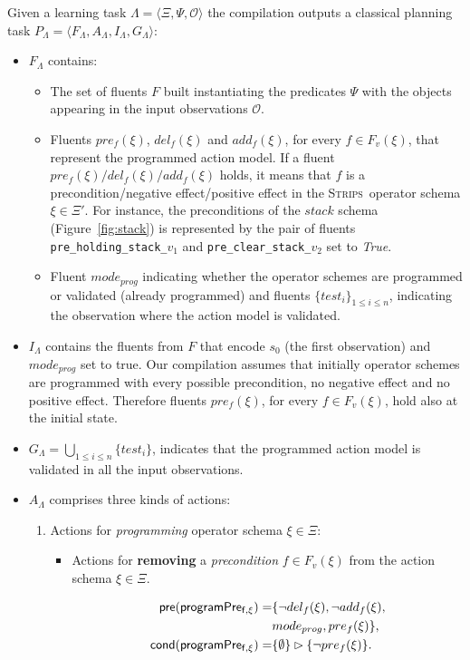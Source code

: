 \documentclass{article}
\newcommand{\tup}[1]{{\langle #1 \rangle}}
\newcommand{\pre}{\mathsf{pre}}     %
\newcommand{\cond}{\mathsf{cond}}   %
\newcommand{\strips}{\textsc{Strips}}     %
\begin{document}
Given a learning task $\Lambda=\tup{\Xi,\Psi,\mathcal{O}}$ the compilation outputs a classical planning task $P_{\Lambda}=\tup{F_{\Lambda},A_{\Lambda},I_{\Lambda},G_{\Lambda}}$:
\begin{itemize}
\item $F_{\Lambda}$ contains:
\begin{itemize}
\item The set of fluents $F$ built instantiating the predicates $\Psi$ with the objects appearing in the input observations $\mathcal{O}$.
\item Fluents $pre_f(\xi)$, $del_f(\xi)$ and $add_f(\xi)$, for every $f\in F_v(\xi)$, that represent the programmed action model. If a fluent $pre_f(\xi)/del_f(\xi)/add_f(\xi)$ holds, it means that $f$ is a precondition/negative effect/positive effect in the \strips\ operator schema $\xi\in \Xi'$. For instance, the preconditions of the $stack$ schema (Figure~\ref{fig:stack}) is represented by the pair of fluents {\small\tt pre\_holding\_stack\_$v_1$} and {\small\tt pre\_clear\_stack\_$v_2$} set to {\em True}.
\item Fluent $mode_{prog}$ indicating whether the operator schemes are programmed or validated (already programmed) and fluents $\{test_i\}_{1\leq i\leq n}$, indicating the observation where the action model is validated.
\end{itemize}
\item $I_{\Lambda}$ contains the fluents from $F$ that encode $s_0$ (the first observation) and $mode_{prog}$ set to true. Our compilation assumes that initially operator schemes are programmed with every possible precondition, no negative effect and no positive effect. Therefore fluents $pre_f(\xi)$, for every $f\in F_v(\xi)$, hold also at the initial state.
\item $G_{\Lambda}=\bigcup_{1\leq i\leq n}\{test_i\}$, indicates that the programmed action model is validated in all the input observations.
\item $A_{\Lambda}$ comprises three kinds of actions:
\begin{enumerate}
\item Actions for {\em programming} operator schema $\xi\in\Xi$:
\begin{itemize}
\item Actions for {\bf removing} a {\em precondition} $f\in F_v(\xi)$ from the action schema $\xi\in\Xi$.

\begin{small}
\begin{align*}
\hspace*{7pt}\pre(\mathsf{programPre_{f,\xi}})=&\{\neg del_{f}(\xi),\neg add_{f}(\xi),\\
& mode_{prog}, pre_{f}(\xi)\},\\
\cond(\mathsf{programPre_{f,\xi}})=&\{\emptyset\}\rhd\{\neg pre_{f}(\xi)\}.
\end{align*}
\end{small}


\end{itemize}
\end{enumerate}
\end{itemize}
\end{document}
